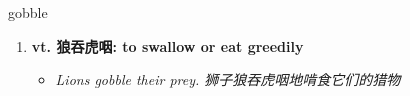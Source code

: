 
\begin{frame}
{\huge gobble}
\begin{center}
\begin{enumerate}\Large
  \item \textbf{vt. 狼吞虎咽: to swallow or eat greedily}
  \begin{itemize}
    \item \em{\Large{Lions gobble their prey. 狮子狼吞虎咽地啃食它们的猎物}}
  \end{itemize}
\end{enumerate}
\end{center}
\end{frame}
